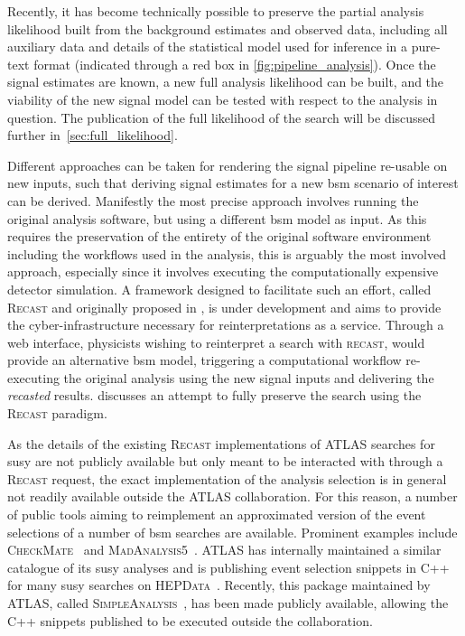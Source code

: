 Recently, it has become technically possible to preserve the partial analysis likelihood built from the background estimates and observed data, including all auxiliary data and details of the statistical model used for inference in a pure-text format (indicated through a red box in \cref{fig:pipeline_analysis}). 
Once the signal estimates are known, a new full analysis likelihood can be built, and the viability of the new signal model can be tested with respect to the analysis in question. The publication of the full likelihood of the \onelepton search will be discussed further in~\cref{sec:full_likelihood}.

Different approaches can be taken for rendering the signal pipeline re-usable on new inputs, such that deriving signal estimates for a new \gls{bsm} scenario of interest can be derived. Manifestly the most precise approach involves running the original analysis software, but using a different \gls{bsm} model as input. As this requires the preservation of the entirety of the original software environment including the workflows used in the analysis, this is arguably the most involved approach, especially since it involves executing the computationally expensive detector simulation. 
A framework designed to facilitate such an effort, called \textsc{Recast} and originally proposed in \cite{RECAST_cranmer}, is under development and aims to provide the cyber-infrastructure necessary for reinterpretations as a service. 
Through a web interface, physicists wishing to reinterpret a search with \textsc{recast}, would provide an alternative \gls{bsm} model, triggering a computational workflow re-executing the original analysis using the new signal inputs and delivering the \textit{recasted} results.  discusses an attempt to fully preserve the \onelepton search using the \textsc{Recast} paradigm. 

As the details of the existing \textsc{Recast} implementations of ATLAS searches for \gls{susy} are not publicly available but only meant to be interacted with through a \textsc{Recast} request, the exact implementation of the analysis selection is in general not readily available outside the ATLAS collaboration. For this reason, a number of public tools aiming to reimplement an approximated version of the event selections of a number of \gls{bsm} searches are available. Prominent examples include \textsc{CheckMate}~\cite{Checkmate2:2016npn,Checkmate:2013wra} and \textsc{MadAnalysis5}~\cite{MadAnalysis:2012fm}. ATLAS has internally maintained a similar catalogue of its \gls{susy} analyses and is publishing event selection snippets in C++ for many \gls{susy} searches on \textsc{HEPData}~\cite{HEPData:2017ypu}. Recently, this package maintained by ATLAS, called \textsc{SimpleAnalysis}~\cite{simpleanalysis}, has been made publicly available, allowing the C++ snippets published to be executed outside the collaboration.

